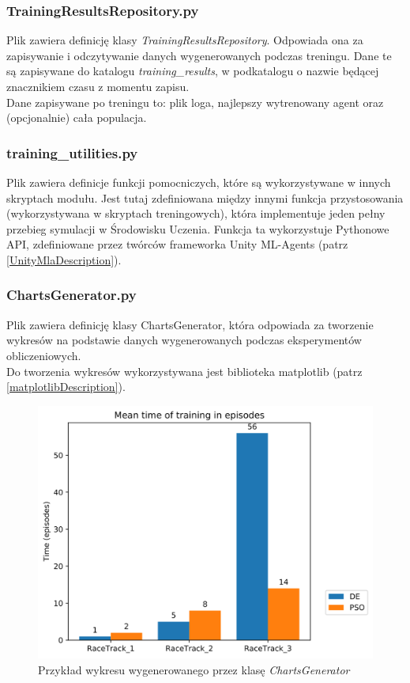 \subsubsection{TrainingResultsRepository.py}
Plik zawiera definicję klasy \textit{TrainingResultsRepository}. Odpowiada ona za zapisywanie i odczytywanie danych wygenerowanych podczas treningu. Dane te są zapisywane do katalogu \textit{training\_results}, w podkatalogu o nazwie będącej znacznikiem czasu z momentu zapisu. \\
Dane zapisywane po treningu to: plik loga, najlepszy wytrenowany agent oraz (opcjonalnie) cała populacja.

\subsubsection{training\_utilities.py}
Plik zawiera definicje funkcji pomocniczych, które są wykorzystywane w innych skryptach modułu. Jest tutaj zdefiniowana między innymi funkcja przystosowania (wykorzystywana w skryptach treningowych), która implementuje jeden pełny przebieg symulacji w Środowisku Uczenia. Funkcja ta wykorzystuje Pythonowe API, zdefiniowane przez twórców frameworka Unity ML-Agents (patrz \ref{UnityMlaDescription}).

\subsubsection{ChartsGenerator.py}
Plik zawiera definicję klasy ChartsGenerator, która odpowiada za tworzenie wykresów na podstawie danych wygenerowanych podczas eksperymentów obliczeniowych. \\
Do tworzenia wykresów wykorzystywana jest biblioteka matplotlib (patrz \ref{matplotlibDescription}).

\vspace{0.5cm}
\begin{figure}[H]
\centering
\includegraphics[width=13cm]{resources/figures/train_time_episodes.png}
\caption{Przykład wykresu wygenerowanego przez klasę \textit{ChartsGenerator}}
\label{GeneratedChartExample}
\end{figure}

